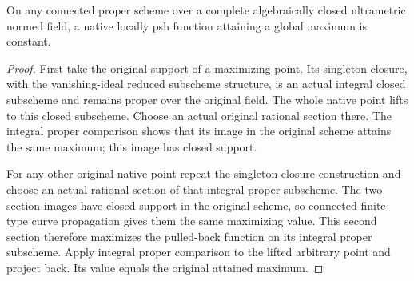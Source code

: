 \begin{theorem}
\label{thm:fc-connected-proper-native-maximum}
\leanok
{}
On any connected proper scheme over a complete algebraically closed
ultrametric normed field, a native locally psh function attaining a global
maximum is constant.
\end{theorem}
\begin{proof}
First take the original support of a maximizing point. Its singleton closure,
with the vanishing-ideal reduced subscheme structure, is an actual integral
closed subscheme and remains proper over the original field. The whole native
point lifts to this closed subscheme. Choose an actual original rational
section there. The integral proper comparison shows that its image in the
original scheme attains the same maximum; this image has closed support.

For any other original native point repeat the singleton-closure construction
and choose an actual rational section of that integral proper subscheme. The
two section images have closed support in the original scheme, so connected
finite-type curve propagation gives them the same maximizing value. This
second section therefore maximizes the pulled-back function on its integral
proper subscheme. Apply integral proper comparison to the lifted arbitrary
point and project back. Its value equals the original attained maximum.
\end{proof}
